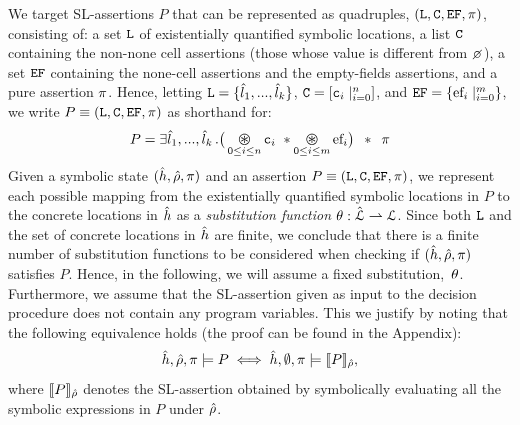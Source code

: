We target SL-assertions $P$ that can be represented as quadruples,
$(\mathtt{L}, \mathtt{C}, \mathtt{EF}, \pi)$, consisting of: 
 a set $\mathtt{L}$ of existentially quantified symbolic locations, 
 a list $\mathtt{C}$ containing the non-none cell assertions (those whose value is different from $\none$), 
 a set $\mathtt{EF}$ containing the none-cell assertions and the empty-fields assertions, and
 a pure assertion $\pi$. 
Hence, letting $\mathtt{L} = \{ \hat{l}_1, ..., \hat{l}_k \}$, $\mathtt{C} = [ \mathtt{c}_i \mid_{i = 0}^n ]$, and
$\mathtt{EF} = \{\mathtt{\text{ef}}_i \mid_{i = 0}^m \}$, we write $P \equiv (\mathtt{L}, \mathtt{C}, \mathtt{EF}, \pi)$ as shorthand for: 
 \begin{equation}
P = \exists \sloc_1, ..., \sloc_k \, . \big( \bigoast_{0 \leq i \leq n} \cell_i \ \sep  \bigoast_{0 \leq i \leq m} \efa_i \big) \ \lstar \ \pfs
\end{equation}
Given a symbolic state $(\hat{h}, \hat\rho, \pi)$ and an assertion $P \equiv (\mathtt{L}, \mathtt{C}, \mathtt{EF}, \pi)$, 
we represent each possible mapping from the existentially quantified symbolic locations in $P$ 
to the concrete locations in $\hat{h}$ as a \emph{substitution function} $\theta : \hat{{\mathcal L}} \rightharpoonup {\mathcal L}$.
Since both $\mathtt{L}$ and the set of concrete locations in $\hat{h}$ 
are finite, we conclude that there is a finite number of substitution functions to be considered 
when checking if $(\hat{h}, \hat\rho, \pi)$ satisfies $P$. 
Hence, in the following, we will assume a fixed substitution,~$\theta$. %
Furthermore, we assume that the SL-assertion given as input to the decision procedure does not contain any program variables. This we justify by noting that the following equivalence holds (the proof can be found in the Appendix):  
\begin{equation}
 \hat{h}, \hat\rho, \pi \models P \iff \hat{h}, \emptyset, \pi \models \llbracket P \rrbracket_{\hat\rho},
\end{equation}
where $\llbracket P \rrbracket_{\hat\rho}$ denotes the SL-assertion obtained by symbolically evaluating 
all the symbolic expressions in $P$ under $\hat\rho$.



